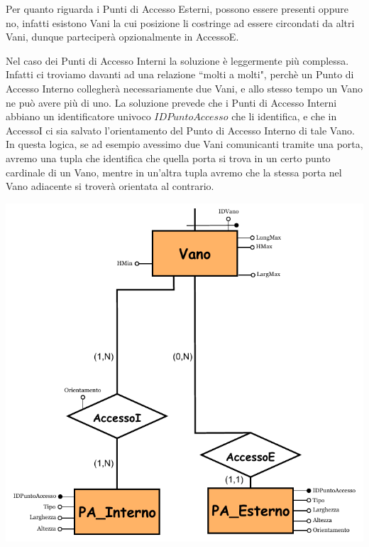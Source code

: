 \documentclass[12pt,a4paper]{report}
\begin{document}
                Per quanto riguarda i Punti di Accesso Esterni, possono essere presenti oppure no, infatti esistono Vani la cui posizione li costringe ad essere circondati da altri Vani, dunque parteciperà opzionalmente in AccessoE. 
                
                Nel caso dei Punti di Accesso Interni la soluzione è leggermente più complessa. Infatti ci troviamo davanti ad una relazione ``molti a molti", perchè un Punto di Accesso Interno collegherà necessariamente due Vani, e allo stesso tempo un Vano ne può avere più di uno. La soluzione prevede che i Punti di Accesso Interni abbiano un identificatore univoco $IDPuntoAccesso$ che li identifica, e che in AccessoI ci sia salvato l'orientamento del Punto di Accesso Interno di tale Vano. In questa logica, se ad esempio avessimo due Vani comunicanti tramite una porta, avremo una tupla che identifica che quella porta si trova in un certo punto cardinale di un Vano, mentre in un'altra tupla avremo che la stessa porta nel Vano adiacente si troverà orientata al contrario.
                \vspace*{0.5cm}
                \begin{center}
                    \includegraphics[scale=0.9]{genPuntoAccessoTrad.pdf}
                \end{center}
\end{document}
